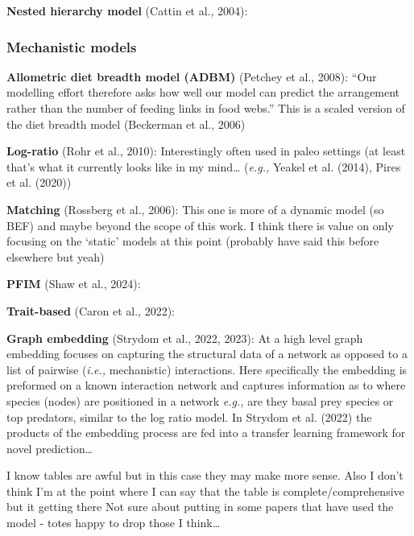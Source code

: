\documentclass[
]{agujournal2019}
\begin{document}
\textbf{Nested hierarchy model} (Cattin et al., 2004):

\subsubsection{Mechanistic models}\label{mechanistic-models}

\textbf{Allometric diet breadth model (ADBM)} (Petchey et al., 2008):
``Our modelling effort therefore asks how well our model can predict the
arrangement rather than the number of feeding links in food webs.'' This
is a scaled version of the diet breadth model (Beckerman et al., 2006)

\textbf{Log-ratio} (Rohr et al., 2010): Interestingly often used in
paleo settings (at least that's what it currently looks like in my
mind\ldots{} (\emph{e.g.,} Yeakel et al. (2014), Pires et al. (2020))

\textbf{Matching} (Rossberg et al., 2006): This one is more of a dynamic
model (so BEF) and maybe beyond the scope of this work. I think there is
value on only focusing on the `static' models at this point (probably
have said this before elsewhere but yeah)

\textbf{PFIM} (Shaw et al., 2024):

\textbf{Trait-based} (Caron et al., 2022):

\textbf{Graph embedding} (Strydom et al., 2022, 2023): At a high level
graph embedding focuses on capturing the structural data of a network as
opposed to a list of pairwise (\emph{i.e.,} mechanistic) interactions.
Here specifically the embedding is preformed on a known interaction
network and captures information as to where species (nodes) are
positioned in a network \emph{e.g.,} are they basal prey species or top
predators, similar to the log ratio model. In Strydom et al. (2022) the
products of the embedding process are fed into a transfer learning
framework for novel prediction\ldots{}

I know tables are awful but in this case they may make more sense. Also
I don't think I'm at the point where I can say that the table is
complete/comprehensive but it getting there Not sure about putting in
some papers that have used the model - totes happy to drop those I
think\ldots{}
\end{document}
